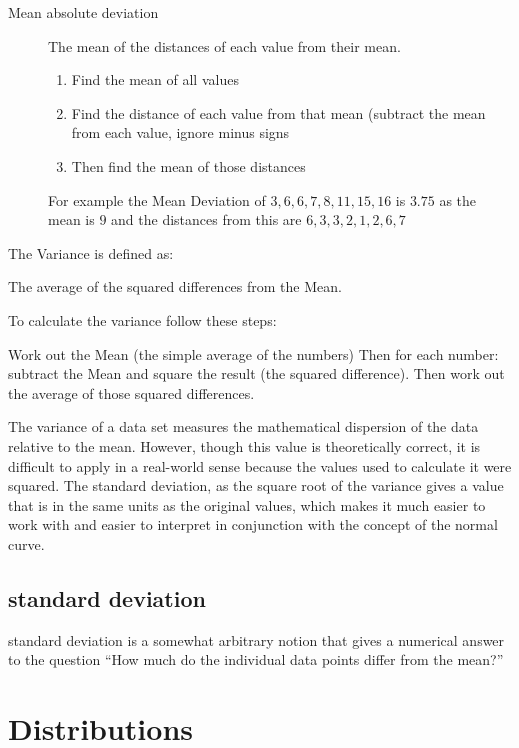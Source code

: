 \begin{description}
    \item [Mean absolute deviation] The mean of the distances of each value from their mean.
\begin{enumerate}
    \item Find the mean of all values
    \item Find the distance of each value from that mean (subtract the mean from each value, ignore minus signs
    \item Then find the mean of those distances
\end{enumerate} For example the Mean Deviation of $3, 6, 6, 7, 8, 11, 15, 16$ is $3.75$ as the mean is $9$ and the distances from this are $6, 3, 3, 2, 1, 2, 6, 7$
\end{description}

The Variance is defined as:

The average of the squared differences from the Mean.

To calculate the variance follow these steps:

Work out the Mean (the simple average of the numbers)
Then for each number: subtract the Mean and square the result (the squared difference).
Then work out the average of those squared differences.

The variance of a data set measures the mathematical dispersion of the data relative to the mean. However, though this value is theoretically correct, it is difficult to apply in a real-world sense because the values used to calculate it were squared. The standard deviation, as the square root of the variance gives a value that is in the same units as the original values, which makes it much easier to work with and easier to interpret in conjunction with the concept of the normal curve.

\subsection{standard deviation}
standard deviation is a somewhat arbitrary notion that gives a numerical answer to the question “How much do the individual data points differ from the mean?”

\section{Distributions}

